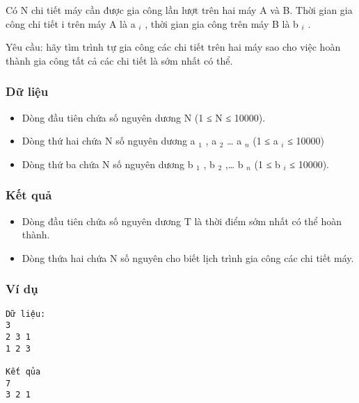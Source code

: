 



   Có N chi tiết máy cần được gia công lần lượt trên hai máy A và B. Thời gian gia công chi tiết i trên máy A là a   $_    i   $   , thời gian gia công trên máy B là b   $_    i   $   .  

   Yêu cầu: hãy tìm trình tự gia công các chi tiết trên hai máy sao cho việc hoàn thành gia công tất cả các chi tiết là sớm nhất có thể.  

\subsubsection{   Dữ liệu  }
\begin{itemize}
	\item     Dòng đầu tiên chứa số nguyên dương N (1 ≤ N ≤ 10000).   
	\item     Dòng thứ hai chứa N số nguyên dương a    $_     1    $    , a    $_     2    $    … a    $_     n    $    (1 ≤ a    $_     i    $    ≤ 10000)   
	\item     Dòng thứ ba chứa N số nguyên dương b    $_     1    $    , b    $_     2    $    ,… b    $_     n    $    (1 ≤ b    $_     i    $    ≤ 10000).   
\end{itemize}

\subsubsection{   Kết quả  }
\begin{itemize}
	\item     Dòng đầu tiên chứa số nguyên dương T là thời điểm sớm nhất có thể hoàn thành.   
	\item     Dòng thứa hai chứa N số nguyên cho biết lịch trình gia công các chi tiết máy.   
\end{itemize}

\subsubsection{   Ví dụ  }
\begin{verbatim}
Dữ liệu:
3
2 3 1
1 2 3

Kết qủa
7
3 2 1
\end{verbatim}